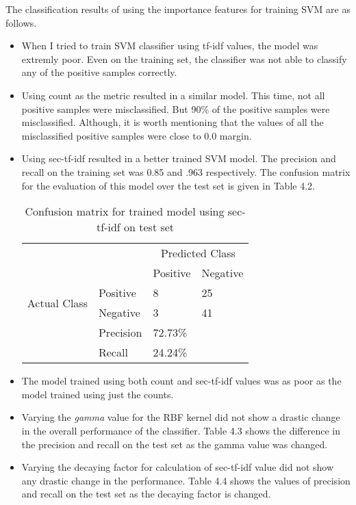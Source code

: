 The classification results of using the importance features for training SVM are as follows.
\begin{itemize}
\item When I tried to train SVM classifier using tf-idf values, the model was extremly poor.
Even on the training set, the classifier was not able to classify any of the positive samples correctly.
\item Using count as the metric resulted in a similar model.
This time, not all positive samples were misclassified. But 90\% of the positive samples were misclassified.
Although, it is worth mentioning that the values of all the misclassified positive samples were close to 0.0 margin.
\item Using sec-tf-idf resulted in a better trained SVM model.
The precision and recall on the training set was 0.85 and .963 respectively.
The confusion matrix for the evaluation of this model over the test set is given in Table 4.2.
\begin{table}[h]
\centering
\caption{Confusion matrix for trained model using sec-tf-idf on test set}
\begin{tabular}{ll|l|l}
\cline{3-4}
                                                   &                                 & \multicolumn{2}{|c|}{Predicted Class}     \\ \cline{3-4} 
                                                   &                                 & Positive & \multicolumn{1}{|l|}{Negative} \\ \hline
\multicolumn{1}{|l}{\multirow{2}{*}{Actual Class}} & \multicolumn{1}{|l|}{Positive}  & 8        & \multicolumn{1}{|l|}{25}       \\ \cline{2-4} 
\multicolumn{1}{|l}{}                              & \multicolumn{1}{|l|}{Negative}  & 3        & \multicolumn{1}{|l|}{41}       \\ \hline
                                                   & \multicolumn{1}{|l|}{Precision} & 72.73\%  &                                \\ \cline{2-3}
                                                   & \multicolumn{1}{|l|}{Recall}    & 24.24\%  &                                \\ \cline{2-3}
\end{tabular}
\end{table}
\item The model trained using both count and sec-tf-idf values was as poor as the model trained using just the counts.
\item Varying the \textit{gamma} value for the RBF kernel did not show a drastic change in the overall performance of the classifier.
Table 4.3 shows the difference in the precision and recall on the test set as the gamma value was changed.
\item Varying the decaying factor for calculation of sec-tf-idf value did not show any drastic change in the performance.
Table 4.4 shows the values of precision and recall on the test set as the decaying factor is changed.
\end{itemize}

